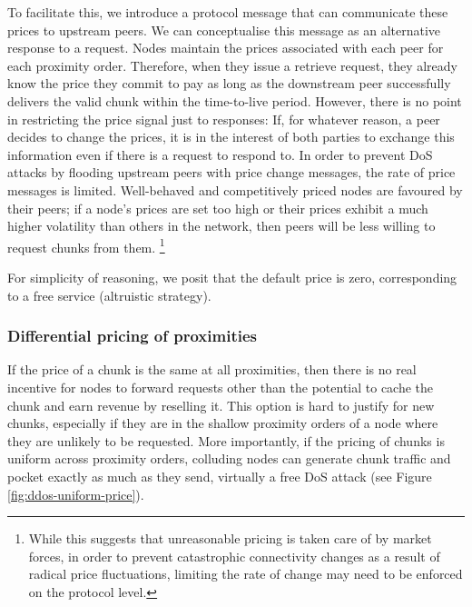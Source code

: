 To facilitate this, we introduce a protocol message that can communicate these prices to upstream peers. We can conceptualise this message as an alternative response to a request. Nodes maintain the prices associated with each peer for each proximity order. Therefore, when they issue a retrieve request, they already know the price they commit to pay as long as the downstream peer successfully delivers the valid chunk within the time-to-live period. However, there is no point in restricting the price signal just to responses: If, for whatever reason, a peer decides to change the prices, it is in the interest of both parties to exchange this information even if there is a request to respond to. In order to prevent DoS attacks by flooding upstream peers with price change messages, the rate of price messages is limited. Well-behaved and competitively priced nodes are favoured by their peers; if a node's prices are set too high or their prices exhibit a much higher volatility than others in the network, then peers will be less willing to request chunks from them.%
%
\footnote{While this suggests that unreasonable pricing is taken care of by market forces, in order to prevent catastrophic connectivity changes as a result of radical price fluctuations, limiting the rate of change may need to be enforced on the protocol level. }

For simplicity of reasoning, we posit that the default price is zero, corresponding to a free service (altruistic strategy). 

\subsubsection{Differential pricing of proximities}\label{sec:diff-pricing-prox}

If the price of a chunk is the same at all proximities, then there is no real incentive for nodes to forward requests other than the potential to cache the chunk and earn revenue by reselling it. This option is hard to justify for new chunks, especially if they are in the shallow proximity orders of a node where they are unlikely to be requested. More importantly, if the pricing of chunks is uniform across proximity orders, colluding nodes can generate chunk traffic and pocket exactly as much as they send, virtually a free DoS attack (see Figure \ref{fig:ddos-uniform-price}).

